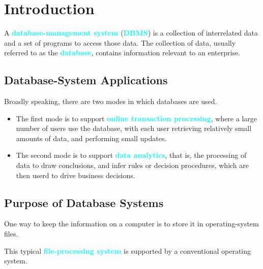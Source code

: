 \documentclass[a4paper,12pt,twoside,openany]{book}
\newcommand{\textcy}[1]{\textbf{\textcolor{cyan}{#1}}}
\begin{document}

\restoregeometry
\thispagestyle{empty}
\setcounter{page}{0}
\tableofcontents
\thispagestyle{empty}
\setcounter{page}{0}


\chapter{Introduction}

A \textcy{database-management system} (\textcy{DBMS}) is a collection of interrelated data and a set of programs to access those data. The collection of data, usually referred to as the \textcy{database}, contains information relevant to an enterprise.

\section{Database-System Applications}

Broadly speaking, there are two modes in which databases are used.
\begin{itemize}
    \item The first mode is to support \textcy{online transaction processing}, where a large number of users use the database, with each user retrieving relatively small amounts of data, and performing small updates.
    \item The second mode is to support \textcy{data analytics}, that is, the processing of data to draw conclusions, and infer rules or decision procedures, which are then userd to drive business decisions.
\end{itemize}

\section{Purpose of Database Systems}

One way to keep the information on a computer is to store it in operating-system files.

This typical \textcy{file-processing system} is supported by a conventional operating system.
\end{document}
